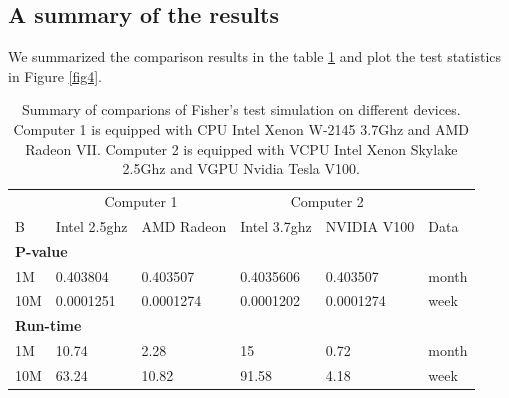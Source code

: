 \documentclass[article,nojss]{jss}\usepackage[]{graphicx}\usepackage[]{color}
\newenvironment{knitrout}{}{} %
\begin{document}
\subsection{A summary of the results}
We summarized the comparison results in the table \ref{tab:summary} and plot the test statistics in Figure \ref{fig4}.
\begin{knitrout}
\color{fgcolor}\begin{table}[H]

\caption{\label{tab:summarycompare}Summary of comparions of Fisher's test simulation on different devices. Computer 1 is equipped with CPU Intel Xenon W-2145 3.7Ghz and AMD Radeon VII. Computer 2 is equipped with VCPU Intel Xenon Skylake 2.5Ghz and VGPU Nvidia Tesla V100.\label{tab:summary}}
\centering
\begin{tabular}[t]{l|l|l|l|l|l}
\hline
\multicolumn{1}{c|}{ } & \multicolumn{2}{c|}{Computer 1} & \multicolumn{2}{c|}{Computer 2} & \multicolumn{1}{c}{ } \\
\cline{2-3} \cline{4-5}
B & Intel 2.5ghz & AMD Radeon & Intel 3.7ghz & NVIDIA V100 & Data\\
\hline
\multicolumn{6}{l}{\textbf{P-value}}\\
\hline
\hspace{1em}1M & 0.403804 & 0.403507 & 0.4035606 & 0.403507 & month\\
\hline
\hspace{1em}10M & 0.0001251 & 0.0001274 & 0.0001202 & 0.0001274 & week\\
\hline
\multicolumn{6}{l}{\textbf{Run-time}}\\
\hline
\hspace{1em}1M & 10.74 & 2.28 & 15 & 0.72 & month\\
\hline
\hspace{1em}10M & 63.24 & 10.82 & 91.58 & 4.18 & week\\
\hline
\end{tabular}
\end{table}

\end{knitrout}
\end{document}

